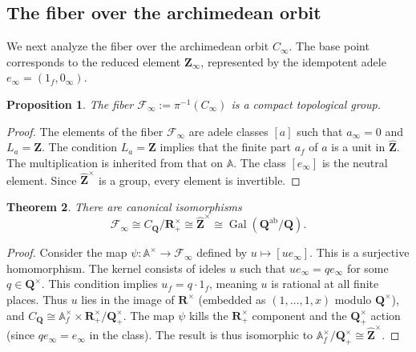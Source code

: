 \documentclass[11pt,a4paper]{article}
\newcommand{\Q}{\mathbf{Q}}
\newcommand{\Z}{\mathbf{Z}}
\newcommand{\R}{\mathbf{R}}
\newcommand{\A}{\mathbb{A}}
\newcommand{\Zhat}{\widehat{\Z}}
\theoremstyle{plain}
\newtheorem{thm}{Theorem}[section]
\newtheorem{prop}[thm]{Proposition}
\newtheorem{rem}[thm]{Remark}
\theoremstyle{definition} %
\begin{document}

\subsection{The fiber over the archimedean orbit}

We next analyze the fiber over the archimedean orbit $C_\infty$.
The base point corresponds to the reduced element $\Z_\infty$, represented by the
idempotent adele $e_\infty=(1_f,0_\infty)$.


\begin{prop}
The fiber $\mathcal{F}_\infty := \pi^{-1}(C_\infty)$ is a compact topological group.
\end{prop}

\begin{proof}
The elements of the fiber $\mathcal{F}_\infty$ are adele classes $[a]$ such that $a_\infty = 0$ and $L_a = \Z$. The condition $L_a = \Z$ implies that the finite part $a_f$ of $a$ is a unit in $\Zhat$.
The multiplication is inherited from that on $\A$. The class $[e_\infty]$ is the neutral element. Since $\Zhat^\times$ is a group, every element is invertible.
\end{proof}

\begin{thm}
There are canonical isomorphisms
\[
\mathcal{F}_\infty \cong C_\Q/\R_+^\times \cong  \Zhat^\times \cong \operatorname{Gal}(\Q^{\text{ab}}/\Q).
\]
\end{thm}



\begin{proof}
Consider the map $\psi: \A^\times \to \mathcal{F}_\infty$ defined by $u \mapsto [u e_\infty]$.
This is a surjective homomorphism.
The kernel consists of ideles $u$ such that $u e_\infty = q e_\infty$ for some $q \in \Q^\times$.
This condition implies $u_f = q \cdot 1_f$, meaning $u$ is rational at all finite places.
Thus $u$ lies in the image of $\R^\times$ (embedded as $(1, \dots, 1, x)$ modulo $\Q^\times$),
and $C_\Q \cong \A_f^\times \times \R_+^\times / \Q_+^\times$.
The map  $\psi$ kills the $\R_+^\times$ component and the $\Q_+^\times$ action (since $q e_\infty = e_\infty$ in the class).
The result is thus isomorphic to $\A_f^\times / \Q_+^\times \cong \Zhat^\times$.
\end{proof}
\end{document}

